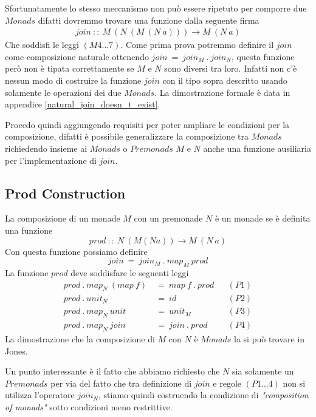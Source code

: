 Sfortunatamente lo stesso meccanismo non può essere ripetuto per comporre due
$Monads$ difatti dovremmo trovare una funzione dalla seguente firma
\begin{align*}
  join\ ::\ M\ (N\ (M\ (N\ a))) \to M\ (N\ a)
\end{align*}
Che soddisfi le leggi $(M4\dots7)$.
Come prima prova potremmo definire il $join$ come composizione naturale
ottenendo $join\ =\ join_M\ .\ join_N$, questa funzione però non è tipata
correttamente se $M$ e $N$ sono diversi tra loro.
Infatti non c'è nessun modo di costruire la funzione $join$ con il tipo sopra
descritto usando solamente le operazioni dei due $Monads$.
La dimostrazione formale è data in appendice \ref{natural_join_doesn_t_exist}.\newline

Procedo quindi aggiungendo requisiti per poter ampliare le condizioni per la
composizione, difatti è possibile generalizzare la composizione tra $Monads$
richiedendo insieme ai $Monads$ o $Premonads$ $M$ e $N$ anche una funzione
ausiliaria per l'implementazione di $join$.

\subsection{Prod Construction}
\label{prod_construction}

La composizione di un monade $M$ con un premonade $N$ è un monade se è definita
una funzione
\begin{equation*}
  prod\ ::\ N\ (M  (N  a)) \to M\ (N\ a)
\end{equation*}
Con questa funzione possiamo definire
\begin{equation*}
  join\ =\ join_M\ .\ map_M\ prod
\end{equation*}
La funzione $prod$ deve soddisfare le seguenti leggi
\begin{align*}
  prod\ .\ map_N\ (map\ f)\ &=\ map\ f\ .\ prod &&(P1)\\
  prod\ .\ unit_N\ &=\ id && (P2)\\
  prod\ .\ map_N\ unit\ &=\ unit_M && (P3)\\
  prod\ .\ map_N\ join\ &=\ join\ .\ prod &&(P4)
\end{align*}
La dimostrazione che la composizione di $M$ con $N$ è $Monads$ la si può
trovare in Jones\cite{jones0}.\newline

Un punto interessante è il fatto che abbiamo richiesto che $N$ sia solamente un
$Premonads$ per via del fatto che tra definizione di $join$ e regole $(P1\dots4)$
non si utilizza l'operatore $join_N$, stiamo quindi costruendo la condizione di
\textit{"composition of monads"} sotto condizioni meno restrittive.\newline


